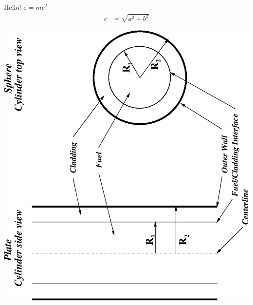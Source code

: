 \documentclass{article}
\begin{document}
Hello! $e=mc^2$
\begin{align}
c&=\sqrt{a^2+b^2}
\end{align}
\begin{center}
\includegraphics{drawing.eps} %
\end{center}
\end{document}
